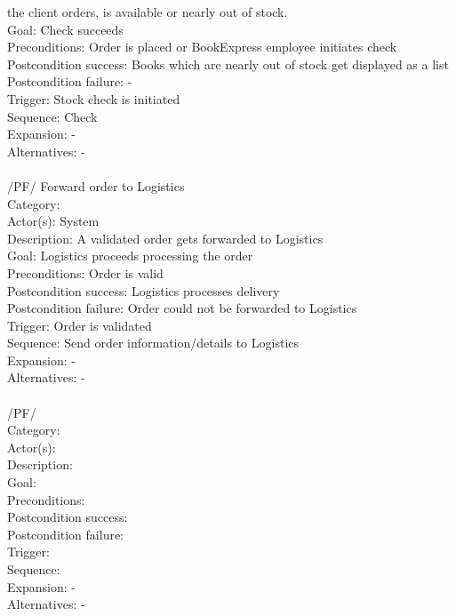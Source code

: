 \documentclass[11pt,a4paper,oneside,svgnames]{report}
\begin{document}
\begin{tabbing}
	 \> the client orders, is available or nearly out of stock.\\ 
	 Goal: \> Check succeeds\\
	 Preconditions: \> Order is placed or BookExpress employee initiates check\\
	 Postcondition success: \> Books which are nearly out of stock get displayed as a list\\
	 Postcondition failure: \> -\\
	 Trigger: \> Stock check is initiated\\
	 Sequence: \> Check \\
	 Expansion: \> -\\
	 Alternatives: \> -\\
	 \\
	 /PF/ \> Forward order to Logistics\\ 
	 Category: \> \\
	 Actor(s): \> System\\ 
	 Description: \> A validated order gets forwarded to Logistics\\ 
	 Goal: \> Logistics proceeds processing the order\\
	 Preconditions: \> Order is valid\\
	 Postcondition success: \> Logistics processes delivery\\
	 Postcondition failure: \> Order could not be forwarded to Logistics\\
	 Trigger: \> Order is validated\\
	 Sequence: \> Send order information/details to Logistics\\
	 Expansion: \> -\\
	 Alternatives: \> -\\
	 \\
	 /PF/ \> \\ 
	 Category: \> \\
	 Actor(s): \> \\ 
	 Description: \> \\ 
	 Goal: \> \\
	 Preconditions: \> \\
	 Postcondition success: \> \\
	 Postcondition failure: \> \\
	 Trigger: \> \\
	 Sequence: \> \\
	 Expansion: \> -\\
	 Alternatives: \> -\\
	 \\
\end{tabbing} 
\clearpage
\end{document}
